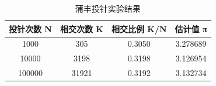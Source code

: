 \begin{table}[htbp]
\centering
\caption{蒲丰投针实验结果}
\begin{tabular}{cccc}
\hline
投针次数 N & 相交次数 K & 相交比例 K/N & 估计值 π \\
\hline
1000 & 305 & 0.3050 & 3.278689 \\
10000 & 3198 & 0.3198 & 3.126954 \\
100000 & 31921 & 0.3192 & 3.132734 \\
\hline
\end{tabular}
\end{table}